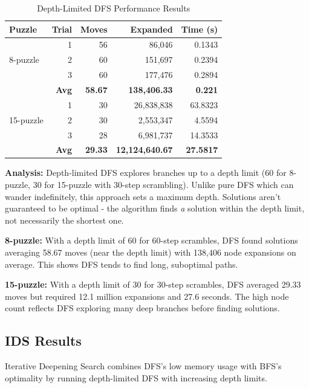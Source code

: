 \documentclass[letterpaper]{article}
\begin{document}
\begin{table}[h]
\centering
\tiny
\begin{tabular}{lrrrr}
\toprule
\textbf{Puzzle} & \textbf{Trial} & \textbf{Moves} & \textbf{Expanded} & \textbf{Time (s)} \\
\midrule
\multirow{3}{*}{8-puzzle} & 1 & 56 & 86,046 & 0.1343 \\
& 2 & 60 & 151,697 & 0.2394 \\
& 3 & 60 & 177,476 & 0.2894 \\
\cmidrule{2-5}
& \textbf{Avg} & \textbf{58.67} & \textbf{138,406.33} & \textbf{0.221} \\
\midrule
\multirow{3}{*}{15-puzzle} & 1 & 30 & 26,838,838 & 63.8323 \\
& 2 & 30 & 2,553,347 & 4.5594 \\
& 3 & 28 & 6,981,737 & 14.3533 \\
\cmidrule{2-5}
& \textbf{Avg} & \textbf{29.33} & \textbf{12,124,640.67} & \textbf{27.5817} \\
\bottomrule
\end{tabular}
\caption{Depth-Limited DFS Performance Results}
\end{table}

\textbf{Analysis:} Depth-limited DFS explores branches up to a depth limit (60 for 8-puzzle, 30 for 15-puzzle with 30-step scrambling). Unlike pure DFS which can wander indefinitely, this approach sets a maximum depth. Solutions aren't guaranteed to be optimal - the algorithm finds \textit{a} solution within the depth limit, not necessarily the shortest one.

\textbf{8-puzzle:} With a depth limit of 60 for 60-step scrambles, DFS found solutions averaging 58.67 moves (near the depth limit) with 138,406 node expansions on average. This shows DFS tends to find long, suboptimal paths.

\textbf{15-puzzle:} With a depth limit of 30 for 30-step scrambles, DFS averaged 29.33 moves but required 12.1 million expansions and 27.6 seconds. The high node count reflects DFS exploring many deep branches before finding solutions.

\subsection{IDS Results}

Iterative Deepening Search combines DFS's low memory usage with BFS's optimality by running depth-limited DFS with increasing depth limits.
\end{document}
